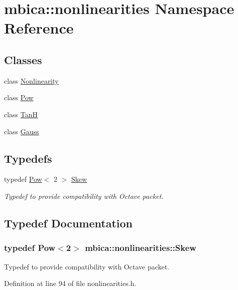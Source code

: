 \hypertarget{namespacembica_1_1nonlinearities}{
\section{mbica::nonlinearities Namespace Reference}
\label{namespacembica_1_1nonlinearities}
}
\subsection*{Classes}
\begin{DoxyCompactItemize}
\item 
class \hyperlink{classmbica_1_1nonlinearities_1_1_nonlinearity}{Nonlinearity}
\item 
class \hyperlink{classmbica_1_1nonlinearities_1_1_pow}{Pow}
\item 
class \hyperlink{classmbica_1_1nonlinearities_1_1_tan_h}{TanH}
\item 
class \hyperlink{classmbica_1_1nonlinearities_1_1_gauss}{Gauss}
\end{DoxyCompactItemize}
\subsection*{Typedefs}
\begin{DoxyCompactItemize}
\item 
typedef \hyperlink{classmbica_1_1nonlinearities_1_1_pow}{Pow}$<$ 2 $>$ \hyperlink{namespacembica_1_1nonlinearities_ad8a629ac3ac19cf239529022ebd90d07}{Skew}
\begin{DoxyCompactList}\small\item\em Typedef to provide compatibility with Octave packet. \item\end{DoxyCompactList}\end{DoxyCompactItemize}


\subsection{Typedef Documentation}
\hypertarget{namespacembica_1_1nonlinearities_ad8a629ac3ac19cf239529022ebd90d07}{
\subsubsection[{Skew}]{\setlength{\rightskip}{0pt plus 5cm}typedef {\bf Pow}$<$2$>$ {\bf mbica::nonlinearities::Skew}}}
\label{namespacembica_1_1nonlinearities_ad8a629ac3ac19cf239529022ebd90d07}


Typedef to provide compatibility with Octave packet. 



Definition at line 94 of file nonlinearities.h.

